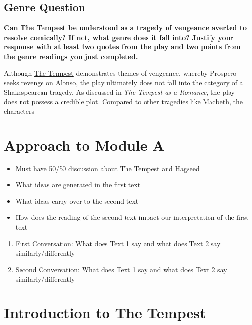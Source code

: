 	\subsection{Genre Question}
		\textbf{Can The Tempest be understood as a tragedy of vengeance averted to resolve comically? If not, what genre does it fall into? Justify your response with at least two quotes from the play and two points from the genre readings you just completed.}

		Although \underline{The Tempest} demonstrates themes of vengeance, whereby Prospero seeks revenge on Alonso, the play ultimately does not fall into the category of a Shakespearean tragedy. As discussed in \textit{The Tempest as a Romance}, the play does not possess a credible plot. Compared to other tragedies like \underline{Macbeth}, the characters 

\section{Approach to Module A} \label{13/02/2025}
	\begin{itemize}
		\item Must have 50/50 discussion about \underline{The Tempest} and \underline{Hagseed}
		\item What ideas are generated in the first text
		\item What ideas carry over to the second text
		\item How does the reading of the second text impact our interpretation of the first text
	\end{itemize}

	\begin{enumerate}
		\item First Conversation: What does Text 1 say and what does Text 2 say similarly/differently
		\item Second Conversation: What does Text 1 say and what does Text 2 say similarly/differently
	\end{enumerate}

\section{Introduction to The Tempest}
